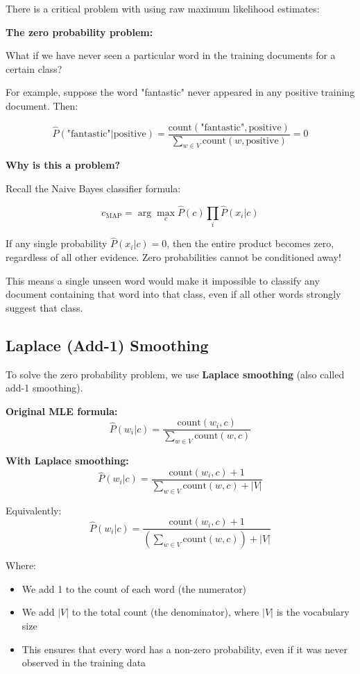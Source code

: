 \documentclass[11pt,a4paper]{article}
\theoremstyle{definition}
\theoremstyle{plain}
\theoremstyle{remark}
\begin{document}
There is a critical problem with using raw maximum likelihood estimates:

\textbf{The zero probability problem:}

What if we have never seen a particular word in the training documents for a certain class?

For example, suppose the word "fantastic" never appeared in any positive training document. Then:

\[
\hat{P}(\text{"fantastic"} | \text{positive}) = \frac{\text{count}(\text{"fantastic"}, \text{positive})}{\sum_{w \in V} \text{count}(w, \text{positive})} = 0
\]

\textbf{Why is this a problem?}

Recall the Naive Bayes classifier formula:

\[
c_{\text{MAP}} = \arg\max_{c} \hat{P}(c) \prod_{i} \hat{P}(x_i | c)
\]

If any single probability $\hat{P}(x_i | c) = 0$, then the entire product becomes zero, regardless of all other evidence. Zero probabilities cannot be conditioned away!

This means a single unseen word would make it impossible to classify any document containing that word into that class, even if all other words strongly suggest that class.

\subsection{Laplace (Add-1) Smoothing}

To solve the zero probability problem, we use \textbf{Laplace smoothing} (also called add-1 smoothing).

\textbf{Original MLE formula:}
\[
\hat{P}(w_i | c) = \frac{\text{count}(w_i, c)}{\sum_{w \in V} \text{count}(w, c)}
\]

\textbf{With Laplace smoothing:}
\[
\hat{P}(w_i | c) = \frac{\text{count}(w_i, c) + 1}{\sum_{w \in V} \text{count}(w, c) + |V|}
\]

Equivalently:
\[
\hat{P}(w_i | c) = \frac{\text{count}(w_i, c) + 1}{\left(\sum_{w \in V} \text{count}(w, c)\right) + |V|}
\]

Where:
\begin{itemize}
    \item We add 1 to the count of each word (the numerator)
    \item We add $|V|$ to the total count (the denominator), where $|V|$ is the vocabulary size
    \item This ensures that every word has a non-zero probability, even if it was never observed in the training data
\end{itemize}
\end{document}
